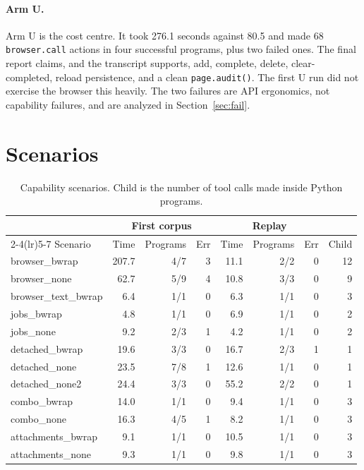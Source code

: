 \documentclass[11pt]{article}
\newcommand{\code}[1]{\texttt{#1}}
\begin{document}
\paragraph{Arm U.}
Arm U is the cost centre. It took 276.1 seconds against 80.5 and made 68
\code{browser.call} actions in four successful programs, plus two failed ones.
The final report claims, and the transcript supports, add, complete, delete,
clear-completed, reload persistence, and a clean \code{page.audit()}. The first
U run did not exercise the browser this heavily. The two failures are API
ergonomics, not capability failures, and are analyzed in Section~\ref{sec:fail}.

\section{Scenarios}

\begin{table}[h]
\centering
\footnotesize
\setlength{\tabcolsep}{3pt}
\begin{tabular}{@{}lrrrrrrr@{}}
\toprule
& \multicolumn{3}{c}{First corpus} & \multicolumn{3}{c}{Replay} & \\
\cmidrule(lr){2-4}\cmidrule(lr){5-7}
Scenario & Time & Programs & Err & Time & Programs & Err & Child \\
\midrule
browser\_bwrap & 207.7 & 4/7 & 3 & 11.1 & 2/2 & 0 & 12 \\
browser\_none & 62.7 & 5/9 & 4 & 10.8 & 3/3 & 0 & 9 \\
browser\_text\_bwrap & 6.4 & 1/1 & 0 & 6.3 & 1/1 & 0 & 3 \\
jobs\_bwrap & 4.8 & 1/1 & 0 & 6.9 & 1/1 & 0 & 2 \\
jobs\_none & 9.2 & 2/3 & 1 & 4.2 & 1/1 & 0 & 2 \\
detached\_bwrap & 19.6 & 3/3 & 0 & 16.7 & 2/3 & 1 & 1 \\
detached\_none & 23.5 & 7/8 & 1 & 12.6 & 1/1 & 0 & 1 \\
detached\_none2 & 24.4 & 3/3 & 0 & 55.2 & 2/2 & 0 & 1 \\
combo\_bwrap & 14.0 & 1/1 & 0 & 9.4 & 1/1 & 0 & 3 \\
combo\_none & 16.3 & 4/5 & 1 & 8.2 & 1/1 & 0 & 3 \\
attachments\_bwrap & 9.1 & 1/1 & 0 & 10.5 & 1/1 & 0 & 3 \\
attachments\_none & 9.3 & 1/1 & 0 & 9.8 & 1/1 & 0 & 3 \\
\bottomrule
\end{tabular}
\caption{Capability scenarios. Child is the number of tool calls made inside
Python programs.}
\end{table}
\end{document}
